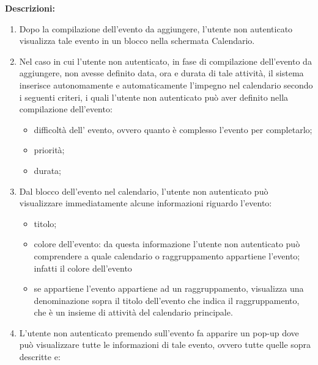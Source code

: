 \begin{listaPersonale}[UC]{}
    \textbf{Descrizioni:}
    \begin{enumerate}
        \item Dopo la compilazione dell'evento da aggiungere, l'utente non autenticato visualizza tale evento in un blocco nella schermata Calendario.
        \item Nel caso in cui l'utente non autenticato, in fase di compilazione dell'evento da aggiungere, non avesse definito data, ora e durata di tale attività, il sistema inserisce autonomamente e automaticamente l'impegno nel calendario secondo i seguenti criteri, i quali l'utente non autenticato può aver definito nella compilazione dell'evento: %
              \begin{itemize}
                  \item difficoltà dell' evento, ovvero quanto è complesso l'evento per completarlo;
                  \item priorità;
                  \item durata;
              \end{itemize}
        \item Dal blocco dell'evento nel calendario, l'utente non autenticato può visualizzare immediatamente alcune informazioni riguardo l'evento:
              \begin{itemize}
                  \item titolo;
                  \item colore dell'evento: da questa informazione l'utente non autenticato può comprendere a quale calendario o raggruppamento appartiene l'evento; infatti il colore dell'evento %
                  \item se appartiene l'evento appartiene ad un raggruppamento, visualizza una denominazione sopra il titolo dell'evento che indica il raggruppamento, che è un insieme di attività del calendario principale.
              \end{itemize}
        \item L'utente non autenticato premendo sull'evento fa apparire un pop-up dove può visualizzare tutte le informazioni di tale evento, ovvero tutte quelle sopra descritte e:
              \begin{itemize}

\end{itemize}
\end{enumerate}
\end{listaPersonale}
